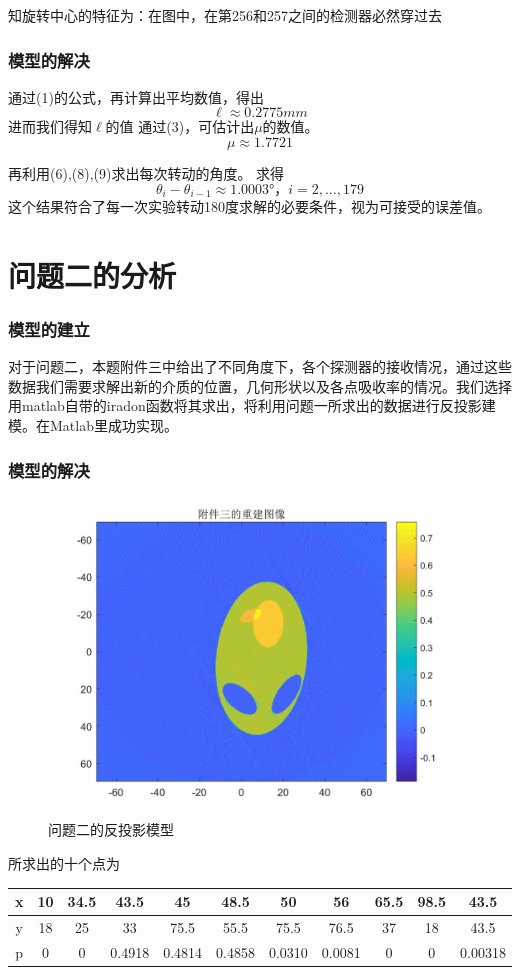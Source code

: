 \documentclass[withoutpreface,bwprint]{cumcmthesis} %
\begin{document}
知旋转中心的特征为：在图中，在第256和257之间的检测器必然穿过去
\subsubsection {模型的解决}
通过(1)的公式，再计算出平均数值，得出
$$\ell \approx 0.2775  mm$$
进而我们得知$\ell$的值
通过(3)，可估计出$\mu$的数值。
\begin{displaymath}
\mu \approx 1.7721
\end{displaymath}

再利用(6),(8),(9)求出每次转动的角度。
求得
\begin{displaymath}
\theta_i-\theta_{i-1} \approx 1.0003°，i=2,\dots,179
\end{displaymath}
这个结果符合了每一次实验转动180度求解的必要条件，视为可接受的误差值。

\section{问题二的分析}
\subsubsection {模型的建立}
对于问题二，本题附件三中给出了不同角度下，各个探测器的接收情况，通过这些数据我们需要求解出新的介质的位置，几何形状以及各点吸收率的情况。我们选择用matlab自带的iradon函数将其求出，将利用问题一所求出的数据进行反投影建模。在Matlab里成功实现。
\subsubsection {模型的解决}
\begin{figure}[H]
\centering
\includegraphics[width=.6\textwidth]{7.jpg}
\caption{问题二的反投影模型}
\end{figure}
所求出的十个点为
\begin{center}
\begin{tabular}{|c|c|c|c|c|c|c|c|c|c|c|}
 \hline
x    &  10   & 34.5   &  43.5       &  45          &  48.5        &  50           &  56          &  65.5      &  98.5   &  43.5\\ \hline 
y    &    18 &  25    &  33           &  75.5        &  55.5       &  75.5        &  76.5       &  37      &  18   &  43.5   \\ \hline
p    &   0    &  0      &  0.4918   &  0.4814   &  0.4858   &  0.0310   &  0.0081   &  0       &  0   &  0.00318\\ \hline
\end{tabular}
\end{center}
\end{document}
